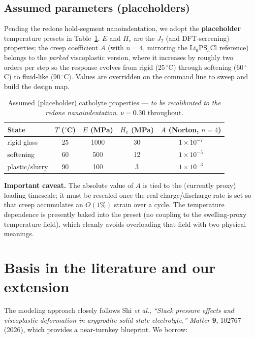 \documentclass[11pt]{article}
\begin{document}
\subsection{Assumed parameters (placeholders)}

Pending the redone hold-segment nanoindentation, we adopt the
\textbf{placeholder} temperature presets in Table~\ref{tab:presets}. $E$ and
$H_v$ are the $J_2$ (and DFT-screening) properties; the creep coefficient $A$
(with $n=4$, mirroring the Li$_6$PS$_5$Cl reference) belongs to the \emph{parked}
viscoplastic version, where it increases by roughly two orders per step so the
response evolves from rigid (25\,$^\circ$C) through softening (60\,$^\circ$C) to
fluid-like (90\,$^\circ$C). Values are overridden on the command line to sweep
and build the design map.

\begin{table}[h]
\centering
\caption{Assumed (placeholder) catholyte properties --- \emph{to be recalibrated
to the redone nanoindentation}. $\nu=0.30$ throughout.}
\label{tab:presets}
\begin{tabular}{lcccc}
\toprule
State & $T$ ($^\circ$C) & $E$ (MPa) & $H_v$ (MPa) & $A$ (Norton, $n{=}4$) \\
\midrule
rigid glass     & 25 & 1000 & 30 & $1\times10^{-7}$ \\
softening       & 60 &  500 & 12 & $1\times10^{-5}$ \\
plastic/slurry  & 90 &  100 &  3 & $1\times10^{-3}$ \\
\bottomrule
\end{tabular}
\end{table}

\noindent\textbf{Important caveat.} The absolute value of $A$ is tied to the
(currently proxy) loading timescale; it must be rescaled once the real
charge/discharge rate is set so that creep accumulates an $O(1\%)$ strain over a
cycle. The temperature dependence is presently baked into the preset (no
coupling to the swelling-proxy temperature field), which cleanly avoids
overloading that field with two physical meanings.

\section{Basis in the literature and our extension}
\label{sec:ref}

The modeling approach closely follows Shi \textit{et al.}, \emph{``Stack
pressure effects and viscoplastic deformation in argyrodite solid-state
electrolyte,''} \emph{Matter} \textbf{9}, 102767 (2026), which provides a
near-turnkey blueprint. We borrow:
\end{document}
